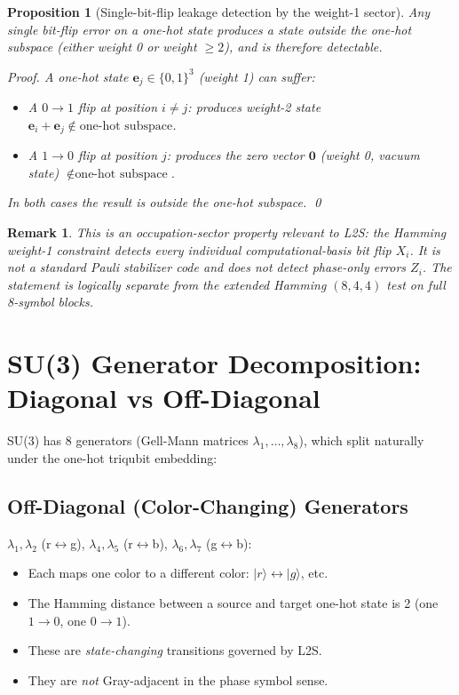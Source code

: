 \documentclass[11pt]{article}
\newtheorem{proposition}{Proposition}
\newtheorem{remark}{Remark}
\begin{document}
\begin{proposition}[Single-bit-flip leakage detection by the weight-1 sector]
\label{prop:hamming_weight1}
Any single bit-flip error on a one-hot state produces a state outside the
one-hot subspace (either weight 0 or weight $\geq 2$), and is therefore
detectable.
\begin{proof}
A one-hot state $\mathbf{e}_j \in \{0,1\}^3$ (weight 1) can suffer:
\begin{itemize}
\item A $0 \to 1$ flip at position $i \neq j$: produces weight-2 state $\mathbf{e}_i +
\mathbf{e}_j \notin \text{one-hot subspace}$.
\item A $1 \to 0$ flip at position $j$: produces the zero vector $\mathbf{0}$
(weight 0, vacuum state) $\notin \text{one-hot subspace}$.
\end{itemize}
In both cases the result is outside the one-hot subspace. \qed
\end{proof}
\end{proposition}

\begin{remark}
This is an occupation-sector property relevant to L2S: the Hamming weight-1
constraint detects every individual computational-basis bit flip $X_i$. It is
not a standard Pauli stabilizer code and does not detect phase-only errors
$Z_i$. The statement is logically separate from the extended Hamming
$(8,4,4)$ test on full 8-symbol blocks.
\end{remark}

\section{SU(3) Generator Decomposition: Diagonal vs Off-Diagonal}

SU(3) has 8 generators (Gell-Mann matrices $\lambda_1,\dots,\lambda_8$), which
split naturally under the one-hot triqubit embedding:

\subsection{Off-Diagonal (Color-Changing) Generators}

$\lambda_1, \lambda_2$ (r$\leftrightarrow$g), $\lambda_4, \lambda_5$
(r$\leftrightarrow$b), $\lambda_6, \lambda_7$ (g$\leftrightarrow$b):

\begin{itemize}
\item Each maps one color to a different color: $|r\rangle \leftrightarrow
|g\rangle$, etc.
\item The Hamming distance between a source and target one-hot state is 2
(one $1\to0$, one $0\to1$).
\item These are \emph{state-changing} transitions governed by L2S.
\item They are \emph{not} Gray-adjacent in the phase symbol sense.
\end{itemize}
\end{document}
